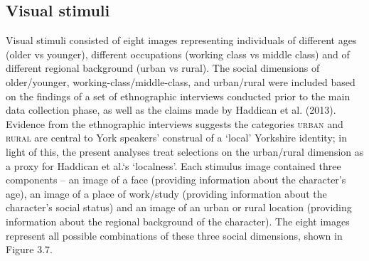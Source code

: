 \documentclass[PWPL]{article}
\begin{document}
\subsection{Visual stimuli}

Visual stimuli consisted of eight images representing individuals of different ages (older vs younger), different occupations (working class vs middle class) and of different regional background (urban vs rural).  The social dimensions of older/younger, working-class/middle-class, and urban/rural were included based on the findings of a set of ethnographic interviews conducted prior to the main data collection phase, as well as the claims made by Haddican et al. (2013). Evidence from the ethnographic interviews suggests the categories \textsc{urban} and \textsc{rural} are central to York speakers' construal of a `local' Yorkshire identity; in light of this, the present analyses treat selections on the urban/rural dimension as a proxy for Haddican et al.`s `localness'. Each stimulus image contained three components -- an image of a face (providing information about the character's age), an image of a place of work/study (providing information about the character's social status) and an image of an urban or rural location (providing information about the regional background of the character). The eight images represent all possible combinations of these three social dimensions, shown in Figure 3.7.
\end{document}
